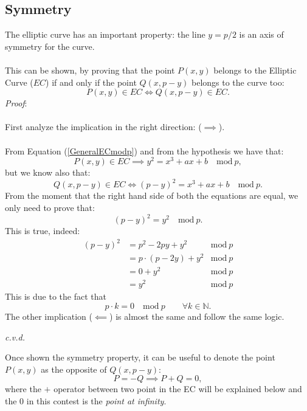 \subsection{Symmetry}
The elliptic curve has an important property: the line $y=p/2$ is an axis of symmetry for the curve.
\\ \\
This can be shown, by proving that the point $P(x,y)$ belongs to the Elliptic Curve ($EC$) if and only if the point $Q(x,p-y)$ belongs to the curve too:
\begin{equation*}
P(x,y) \in EC \iff Q(x,p-y) \in EC.
\end{equation*}
\textit{Proof}:
\\ \\
First analyze the implication in the right direction: ($\implies $).
\\ \\
From Equation (\ref{GeneralECmodp}) and from the hypothesis we have that:
\begin{equation*}
P(x,y) \in EC \implies y^2=x^3+ax+b \quad \textrm{mod} \ p,
\end{equation*}
but we know also that: 
\begin{equation*}
Q(x,p-y) \in EC \iff (p-y)^2=x^3+ax+b \quad \textrm{mod} \ p.
\end{equation*}
From the moment that the right hand side of both the equations are equal, we only need to prove that:
\begin{equation*}
(p-y)^2=y^2 \quad \textrm{mod} \ p.
\end{equation*}
This is true, indeed:
\begin{align*}
(p-y)^2 & = p^2 -2py + y^2 &  \textrm{mod} \ p \\
& = p\cdot(p -2y) + y^2 &  \textrm{mod} \ p \\
& = 0+y^2 &  \textrm{mod} \ p \\
& = y^2 &  \textrm{mod} \ p
\end{align*}
This is due to the fact that 
\begin{equation*}
p\cdot k =0 \quad \textrm{mod} \ p \qquad \forall k\in \mathbb{N}.
\end{equation*}
The other implication ($\impliedby$) is almost the same and follow the same logic.
\begin{flushright}
	\textit{c.v.d.}
\end{flushright}
Once shown the symmetry property, it can be useful to denote the point $P(x,y)$ as the opposite of $Q(x,p-y)$:
\begin{equation*}
P=-Q \implies P+Q=0,
\end{equation*}
where the $+$ operator between two point in the EC will be explained below and the $0$ in this contest is the \textit{point at infinity}.

